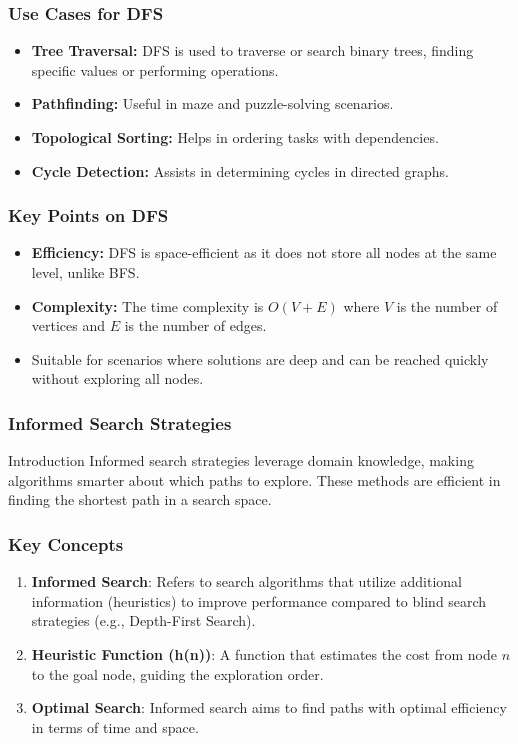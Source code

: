 \documentclass[aspectratio=169]{beamer}
\begin{document}
\begin{frame}
    \frametitle{Use Cases for DFS}
    \begin{itemize}
        \item \textbf{Tree Traversal:} DFS is used to traverse or search binary trees, finding specific values or performing operations.
        \item \textbf{Pathfinding:} Useful in maze and puzzle-solving scenarios.
        \item \textbf{Topological Sorting:} Helps in ordering tasks with dependencies.
        \item \textbf{Cycle Detection:} Assists in determining cycles in directed graphs.
    \end{itemize}
\end{frame}

\begin{frame}
    \frametitle{Key Points on DFS}
    \begin{itemize}
        \item \textbf{Efficiency:} DFS is space-efficient as it does not store all nodes at the same level, unlike BFS.
        \item \textbf{Complexity:} The time complexity is $O(V + E)$ where $V$ is the number of vertices and $E$ is the number of edges.
        \item Suitable for scenarios where solutions are deep and can be reached quickly without exploring all nodes.
    \end{itemize}
\end{frame}

\begin{frame}[fragile]
  \frametitle{Informed Search Strategies}
  \begin{block}{Introduction}
    Informed search strategies leverage domain knowledge, making algorithms smarter about which paths to explore. These methods are efficient in finding the shortest path in a search space.
  \end{block}
\end{frame}

\begin{frame}[fragile]
  \frametitle{Key Concepts}
  \begin{enumerate}
    \item \textbf{Informed Search}:
      Refers to search algorithms that utilize additional information (heuristics) to improve performance compared to blind search strategies (e.g., Depth-First Search).
      
    \item \textbf{Heuristic Function (h(n))}:
      A function that estimates the cost from node \( n \) to the goal node, guiding the exploration order.
      
    \item \textbf{Optimal Search}:
      Informed search aims to find paths with optimal efficiency in terms of time and space.
  \end{enumerate}
\end{frame}
\end{document}
